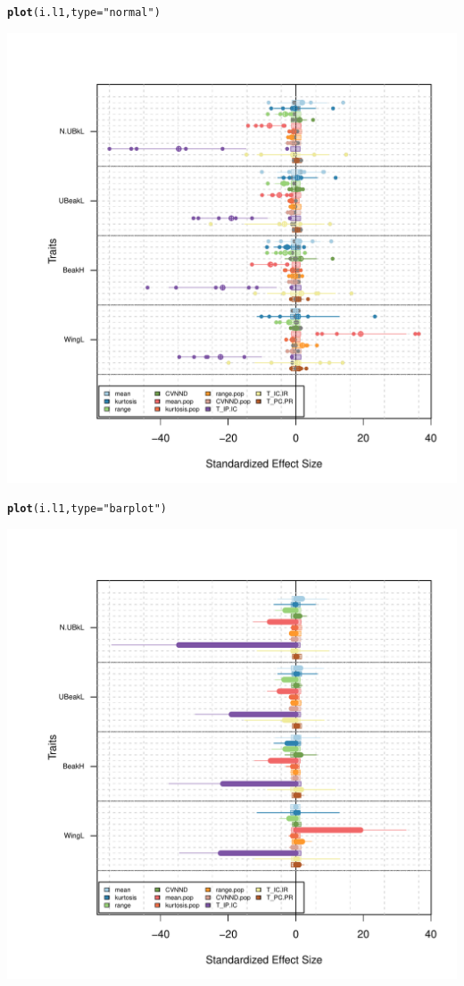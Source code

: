 \documentclass[12pt]{article}\usepackage[]{graphicx}\usepackage[]{color}
\makeatletter
\def\maxwidth{ %
  \ifdim\Gin@nat@width>\linewidth
    \linewidth
  \else
    \Gin@nat@width
  \fi
}
\newcommand{\hlstr}[1]{\textcolor[rgb]{0.192,0.494,0.8}{#1}}%
\newcommand{\hlstd}[1]{\textcolor[rgb]{0.345,0.345,0.345}{#1}}%
\newcommand{\hlkwc}[1]{\textcolor[rgb]{0.333,0.667,0.333}{#1}}%
\newcommand{\hlkwd}[1]{\textcolor[rgb]{0.737,0.353,0.396}{\textbf{#1}}}%
\newenvironment{kframe}{%
 \def\at@end@of@kframe{}%
 \ifinner\ifhmode%
  \def\at@end@of@kframe{\end{minipage}}%
  \begin{minipage}{\columnwidth}%
 \fi\fi%
 \def\FrameCommand##1{\hskip\@totalleftmargin \hskip-\fboxsep
 \colorbox{shadecolor}{##1}\hskip-\fboxsep
     \hskip-\linewidth \hskip-\@totalleftmargin \hskip\columnwidth}%
 \MakeFramed {\advance\hsize-\width
   \@totalleftmargin\z@ \linewidth\hsize
   \@setminipage}}%
 {\par\unskip\endMakeFramed%
 \at@end@of@kframe}
\newenvironment{knitrout}{}{} %
\makeatother
\begin{document}
\begin{knitrout}
\begin{kframe}\begin{alltt}
\hlkwd{plot}\hlstd{(i.l1,}\hlkwc{type} \hlstd{=} \hlstr{"normal"}\hlstd{)}
\end{alltt}
\end{kframe}
\includegraphics[width=\maxwidth]{figure/unnamed-chunk-513} 
\begin{kframe}\begin{alltt}
\hlkwd{plot}\hlstd{(i.l1,}\hlkwc{type} \hlstd{=} \hlstr{"barplot"}\hlstd{)}
\end{alltt}
\end{kframe}
\includegraphics[width=\maxwidth]{figure/unnamed-chunk-514} 

\end{knitrout}
\end{document}
